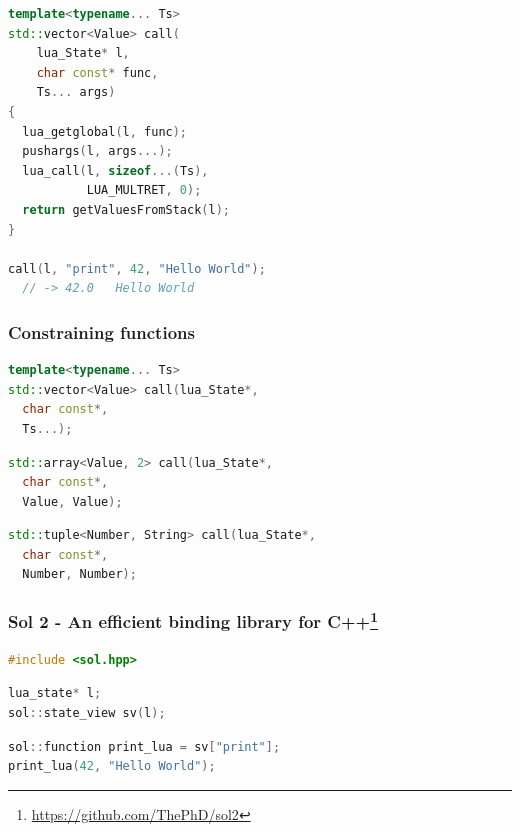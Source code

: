 \documentclass{beamer}
\newif\iftransitions
\begin{document}
\begin{frame}[fragile]
\begin{semiverbatim}
\end{semiverbatim}
  \else
  \begin{lstlisting}[language={C++}]
template<typename... Ts>
std::vector<Value> call(
    lua_State* l,
    char const* func,
    Ts... args)
{
  lua_getglobal(l, func);
  pushargs(l, args...);
  lua_call(l, sizeof...(Ts),
           LUA_MULTRET, 0);
  return getValuesFromStack(l);  
}

call(l, "print", 42, "Hello World");
  // -> 42.0   Hello World
  \end{lstlisting}
  \fi
\end{frame}


\begin{frame}[fragile]
  \frametitle{Constraining functions}

  \begin{lstlisting}[language={C++}]
template<typename... Ts>
std::vector<Value> call(lua_State*,
  char const*,
  Ts...);
  \end{lstlisting}
  \iftransitions \pause \fi
  \begin{lstlisting}[language={C++}]
std::array<Value, 2> call(lua_State*,
  char const*,
  Value, Value);
  \end{lstlisting}
  \iftransitions \pause \fi
  \begin{lstlisting}[language={C++}]
std::tuple<Number, String> call(lua_State*,
  char const*,
  Number, Number);
  \end{lstlisting}

\end{frame}


\begin{frame}[fragile]
  \frametitle{Sol 2 - An efficient binding library for C++\footnote{\href{https://github.com/ThePhD/sol2}{https://github.com/ThePhD/sol2}}}
  
  
  \begin{lstlisting}[language={C++}]
#include <sol.hpp>
  \end{lstlisting}
  \iftransitions \pause \fi
  \begin{lstlisting}[language={C++}]
lua_state* l;
sol::state_view sv(l);
  \end{lstlisting}
  \iftransitions \pause \fi
  \begin{lstlisting}[language={C++}]
sol::function print_lua = sv["print"];
print_lua(42, "Hello World");
  \end{lstlisting}
\end{frame}
\end{document}
